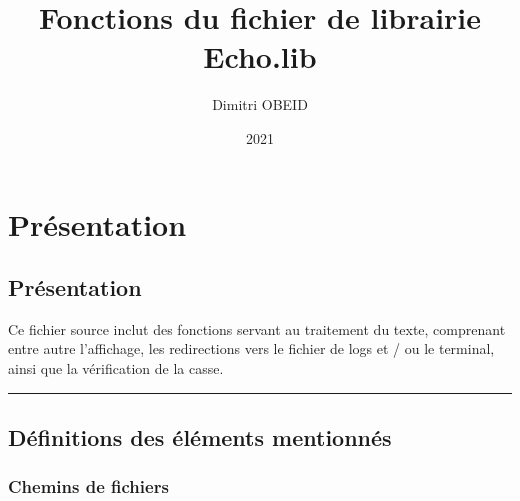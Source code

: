 \documentclass[a4paper,10pt]{article}
\title{\color{sec1}Fonctions du fichier de librairie \color{path}Echo.lib}\color{text}
\author{Dimitri OBEID}
\date{2021}
\begin{document}
\maketitle
\newpage

\hypertarget{contents}{}
\tableofcontents
\newpage

\color{sec1}
\section{Présentation}\color{text}

\color{sec2}
\subsection{Présentation}\color{text}

\begin{justify}
    Ce fichier source inclut des fonctions servant au traitement du texte, comprenant entre autre l'affichage, les redirections vers le fichier de logs et / ou le terminal, ainsi que la vérification de la casse.
\end{justify}



\color{sec2}\par\noindent\rule{\textwidth}{0.4pt}\color{text}

\color{sec2}
\subsection{Définitions des éléments mentionnés}\color{text}

\color{sec3}
\subsubsection{Chemins de fichiers}\color{text}
\end{document}
